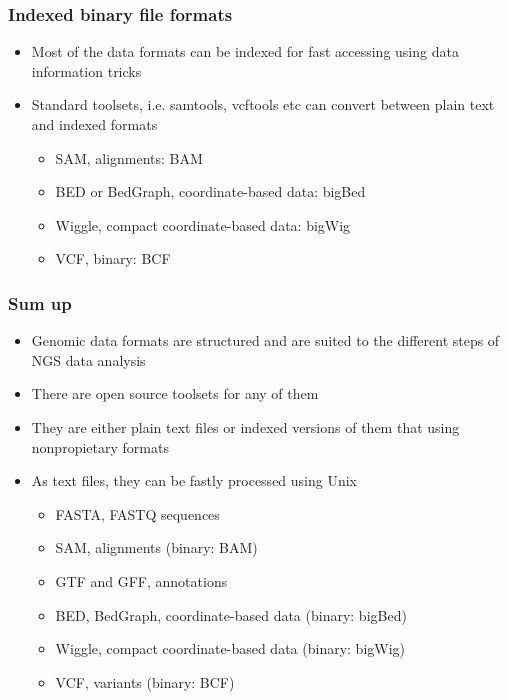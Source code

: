 \documentclass{beamer}
\begin{document}
\begin{frame}
  \frametitle{Indexed binary file formats}

  \begin{itemize}
  \item Most of the data formats can be indexed for fast accessing using data information tricks
  \item Standard toolsets, i.e. samtools, vcftools etc can convert between plain text and indexed formats

    \begin{itemize}
    \item SAM, alignments: BAM
    \item BED or BedGraph, coordinate-based data: bigBed
    \item Wiggle, compact coordinate-based data: bigWig
    \item VCF, binary: BCF
    \end{itemize}
  \end{itemize}

\end{frame}


\begin{frame}
  \frametitle{Sum up}

  \begin{itemize}
  \item Genomic data formats are structured and are suited to the different steps of NGS data analysis
  \item There are open source toolsets for any of them
  \item They are either plain text files or indexed versions of them that using nonpropietary formats
  \item As text files, they can be fastly processed using Unix
    \begin{itemize}
    \item FASTA, FASTQ sequences
    \item SAM, alignments (binary: BAM)
    \item GTF and GFF, annotations
    \item BED, BedGraph, coordinate-based data (binary: bigBed)
    \item Wiggle, compact coordinate-based data (binary: bigWig)
    \item VCF, variants (binary: BCF)
    \end{itemize}
  \end{itemize}

\end{frame}
\end{document}
